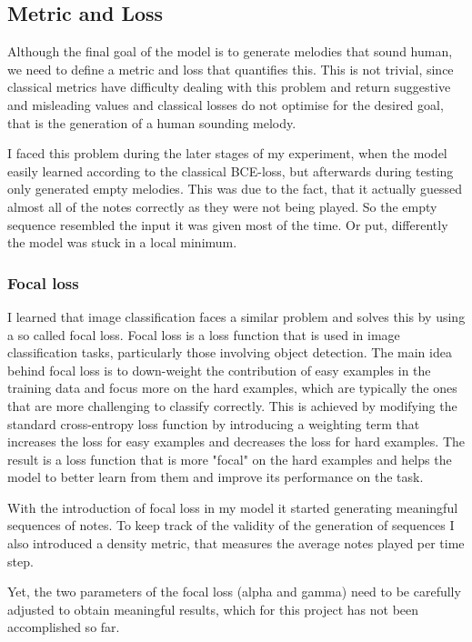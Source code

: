 \documentclass[a4paper, 10pt, xcolor=dvipsnames]{article} %
\begin{document}
\subsection{Metric and Loss}
Although the final goal of the model is to generate melodies that sound human,
we need to define a metric and loss that quantifies this. This is not trivial,
since classical metrics have difficulty dealing with this problem and return
suggestive and misleading values and classical losses do not optimise for the
desired goal, that is the generation of a human sounding melody.

I faced this problem during the later stages of my experiment, when the model
easily learned according to the classical BCE-loss, but afterwards during
testing only generated empty melodies. This was due to the fact, that it
actually guessed almost all of the notes correctly as they were not being
played. So the empty sequence resembled the input it was given most of the
time. Or put, differently the model was stuck in a local minimum.

\subsubsection{Focal loss}

I learned that image classification faces a similar problem and solves this by
using a so called focal loss. Focal loss is a loss function that is used in
image classification tasks, particularly those involving object detection. The
main idea behind focal loss is to down-weight the contribution of easy examples
in the training data and focus more on the hard examples, which are typically
the ones that are more challenging to classify correctly. This is achieved by
modifying the standard cross-entropy loss function by introducing a weighting
term that increases the loss for easy examples and decreases the loss for hard
examples. The result is a loss function that is more "focal" on the hard
examples and helps the model to better learn from them and improve its
performance on the task.

With the introduction of focal loss in my model it started generating
meaningful sequences of notes. To keep track of the validity of the generation
of sequences I also introduced a density metric, that measures the average
notes played per time step.

Yet, the two parameters of the focal loss (alpha and gamma) need to be
carefully adjusted to obtain meaningful results, which for this project has not
been accomplished so far.
\end{document}
